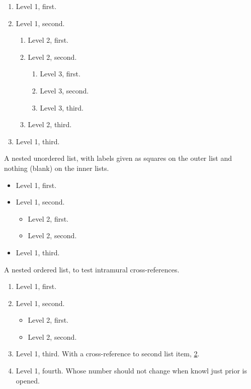 \documentclass[10pt,]{article}
\theoremstyle{plain}
\theoremstyle{definition}
\theoremstyle{definition}
\theoremstyle{definition}
\theoremstyle{definition}
\theoremstyle{definition}
\theoremstyle{definition}
\numberwithin{equation}{section}
\begin{document}
\begin{enumerate}[label=*\Roman**]
\item\hypertarget{li-98}{}\hypertarget{p-368}{}%
Level 1, first.%
\item\hypertarget{li-99}{}\hypertarget{p-369}{}%
Level 1, second.%
\begin{enumerate}[label=++\Alph*]
\item\hypertarget{li-100}{}\hypertarget{p-370}{}%
Level 2, first.%
\item\hypertarget{li-101}{}\hypertarget{p-371}{}%
Level 2, second.%
\begin{enumerate}[label=\arabic*)]
\item\hypertarget{li-102}{}\hypertarget{p-372}{}%
Level 3, first.%
\item\hypertarget{li-103}{}\hypertarget{p-373}{}%
Level 3, second.%
\item\hypertarget{li-104}{}\hypertarget{p-374}{}%
Level 3, third.%
\end{enumerate}
%
\item\hypertarget{li-105}{}\hypertarget{p-375}{}%
Level 2, third.%
\end{enumerate}
%
\item\hypertarget{li-106}{}\hypertarget{p-376}{}%
Level 1, third.%
\end{enumerate}
%
\par
\hypertarget{p-377}{}%
A nested unordered list, with labels given as squares on the outer list and nothing (blank) on the inner lists.\leavevmode%
\begin{itemize}[label=$\blacksquare$]
\item{}\hypertarget{p-378}{}%
Level 1, first.%
\item{}\hypertarget{p-379}{}%
Level 1, second.%
\begin{itemize}[label=]
\item{}\hypertarget{p-380}{}%
Level 2, first.%
\item{}\hypertarget{p-381}{}%
Level 2, second.%
\end{itemize}
%
\item{}\hypertarget{p-382}{}%
Level 1, third.%
\end{itemize}
%
\par
\hypertarget{p-383}{}%
A nested ordered list, to test intramural cross-references.\leavevmode%
\begin{enumerate}
\item\hypertarget{li-112}{}\hypertarget{p-384}{}%
Level 1, first.%
\item\hypertarget{list-item-second}{}\hypertarget{p-385}{}%
Level 1, second.%
\begin{itemize}[label=]
\item{}\hypertarget{p-386}{}%
Level 2, first.%
\item{}\hypertarget{p-387}{}%
Level 2, second.%
\end{itemize}
%
\item\hypertarget{li-116}{}\hypertarget{p-388}{}%
Level 1, third.  With a cross-reference to second list item, \hyperlink{list-item-second}{2}.%
\item\hypertarget{li-117}{}\hypertarget{p-389}{}%
Level 1, fourth.  Whose number should not change when knowl just prior is opened.%
\end{enumerate}
\end{document}
